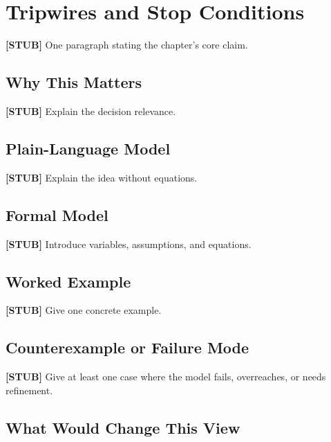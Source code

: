 
\chapter{Tripwires and Stop Conditions}
\label{ch:tripwires-stop-conditions}

\begin{chapterthesis}
\textbf{[STUB]} One paragraph stating the chapter's core claim.
\end{chapterthesis}

\section{Why This Matters}

\textbf{[STUB]} Explain the decision relevance.

\section{Plain-Language Model}

\textbf{[STUB]} Explain the idea without equations.

\section{Formal Model}

\textbf{[STUB]} Introduce variables, assumptions, and equations.

\section{Worked Example}

\textbf{[STUB]} Give one concrete example.

\section{Counterexample or Failure Mode}

\textbf{[STUB]} Give at least one case where the model fails, overreaches, or needs refinement.

\section{What Would Change This View}

